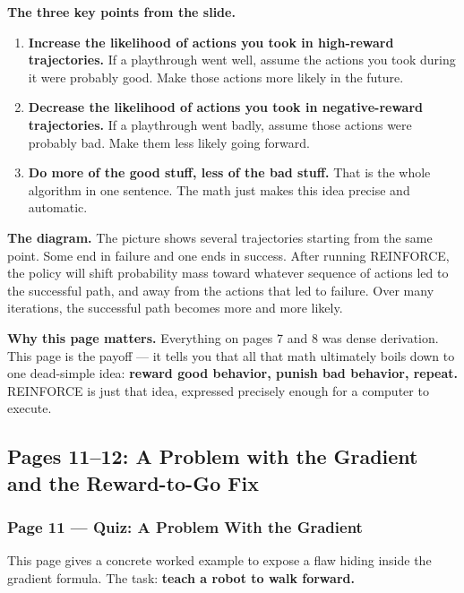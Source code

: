 \medskip
\textbf{The three key points from the slide.}

\begin{enumerate}
  \item \textbf{Increase the likelihood of actions you took in high-reward trajectories.}
        If a playthrough went well, assume the actions you took during it were probably good.
        Make those actions more likely in the future.

  \item \textbf{Decrease the likelihood of actions you took in negative-reward trajectories.}
        If a playthrough went badly, assume those actions were probably bad. Make them less
        likely going forward.

  \item \textbf{Do more of the good stuff, less of the bad stuff.}
        That is the whole algorithm in one sentence. The math just makes this idea precise
        and automatic.
\end{enumerate}

\textbf{The diagram.} The picture shows several trajectories starting from the same point.
Some end in failure and one ends in success. After running REINFORCE, the policy will shift
probability mass toward whatever sequence of actions led to the successful path, and away
from the actions that led to failure. Over many iterations, the successful path becomes more
and more likely.

\textbf{Why this page matters.} Everything on pages 7 and 8 was dense derivation. This page
is the payoff --- it tells you that all that math ultimately boils down to one dead-simple
idea: \textbf{reward good behavior, punish bad behavior, repeat.} REINFORCE is just that idea,
expressed precisely enough for a computer to execute.


\subsection{Pages 11--12: A Problem with the Gradient and the Reward-to-Go Fix}

\subsubsection*{Page 11 --- Quiz: A Problem With the Gradient}

This page gives a concrete worked example to expose a flaw hiding inside the gradient formula.
The task: \textbf{teach a robot to walk forward.}


